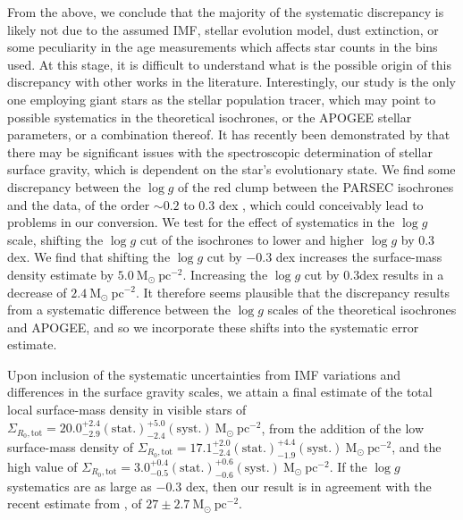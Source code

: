 From the above, we conclude that the majority of the systematic discrepancy is likely not due to the assumed IMF, stellar evolution model, dust extinction, or some peculiarity in the age measurements which affects star counts in the bins used. At this stage, it is difficult to understand what is the possible origin of this discrepancy with other works in the literature. Interestingly, our study is the only one employing giant stars as the stellar population tracer, which may point to possible systematics in the theoretical isochrones, or the APOGEE stellar parameters, or a combination thereof. It has recently been demonstrated by \citet{2017A&A...597L...3M} that there may be significant issues with the spectroscopic determination of stellar surface gravity, which is dependent on the star's evolutionary state. We find some discrepancy between the $\log{g}$ of the red clump between the PARSEC isochrones and the data, of the order $\sim 0.2$ to $0.3$ dex \citep[similar to that found by][albeit based on APOGEE-DR13 data]{2017A&A...597L...3M}, which could conceivably lead to problems in our conversion. We test for the effect of systematics in the $\log{g}$ scale, shifting the $\log{g}$ cut of the isochrones to lower and higher $\log{g}$ by $0.3$ dex. We find that shifting the $\log{g}$ cut by $-0.3$ dex increases the surface-mass density estimate by $5.0\ \mathrm{M_{\odot}\ pc^{-2}}$. Increasing the $\log{g}$ cut by $0.3$dex results in a decrease of $ 2.4\ \mathrm{M_{\odot}\ pc^{-2}}$. It therefore seems plausible that the discrepancy results from a systematic difference between the $\log{g}$ scales of the theoretical isochrones and APOGEE, and so we incorporate these shifts into the systematic error estimate. 

Upon inclusion of the systematic uncertainties from IMF variations and differences in the surface gravity scales, we attain a final estimate of the total local surface-mass density in visible stars of $\Sigma_{R_0, \text{tot}} = 20.0_{-2.9}^{+2.4}\mathrm{(stat.)}_{-2.4}^{+5.0}\mathrm{(syst.)}\ \mathrm{M_{\odot} \ pc^{-2}}$, from the addition of the low \afe{} surface-mass density of $\Sigma_{R_0, \text{tot}} = 17.1_{-2.4}^{+2.0}\mathrm{(stat.)}_{-1.9}^{+4.4}\mathrm{(syst.)}\ \mathrm{M_{\odot} \ pc^{-2}}$, and the high \afe{} value of $\Sigma_{R_0, \text{tot}} = 3.0_{-0.5}^{+0.4}\mathrm{(stat.)}_{-0.6}^{+0.6}\mathrm{(syst.)}\ \mathrm{M_{\odot} \ pc^{-2}}$.  If the $\log{g}$ systematics are as large as $-0.3$ dex, then our result is in agreement with the recent estimate from \citet{2015ApJ...814...13M}, of $27\pm 2.7\ \mathrm{M_{\odot} \ pc^{-2}}$.

